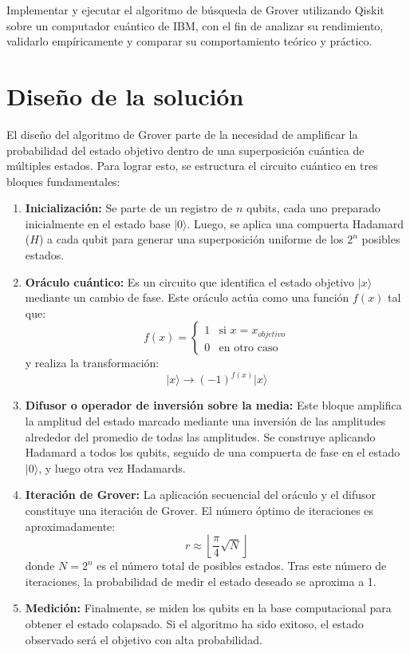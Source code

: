 \documentclass{article}
\begin{document}
Implementar y ejecutar el algoritmo de búsqueda de Grover utilizando Qiskit sobre un computador cuántico de IBM, con el fin de analizar su rendimiento, validarlo empíricamente y comparar su comportamiento teórico y práctico.

\section{Diseño de la solución}\label{sec:dis}

El diseño del algoritmo de Grover parte de la necesidad de amplificar la probabilidad del estado objetivo dentro de una superposición cuántica de múltiples estados. Para lograr esto, se estructura el circuito cuántico en tres bloques fundamentales:

\begin{enumerate}
    \item \textbf{Inicialización:} Se parte de un registro de $n$ qubits, cada uno preparado inicialmente en el estado base $\vert 0 \rangle$. Luego, se aplica una compuerta Hadamard ($H$) a cada qubit para generar una superposición uniforme de los $2^n$ posibles estados.

    \item \textbf{Oráculo cuántico:} Es un circuito que identifica el estado objetivo $\vert x \rangle$ mediante un cambio de fase. Este oráculo actúa como una función $f(x)$ tal que:
    \[
    f(x) = \begin{cases}
    1 & \text{si } x = x_{objetivo} \\
    0 & \text{en otro caso}
    \end{cases}
    \]
    y realiza la transformación:
    \[
    \vert x \rangle \rightarrow (-1)^{f(x)} \vert x \rangle
    \]

    \item \textbf{Difusor o operador de inversión sobre la media:} Este bloque amplifica la amplitud del estado marcado mediante una inversión de las amplitudes alrededor del promedio de todas las amplitudes. Se construye aplicando Hadamard a todos los qubits, seguido de una compuerta de fase en el estado $\vert 0 \rangle$, y luego otra vez Hadamards.

    \item \textbf{Iteración de Grover:} La aplicación secuencial del oráculo y el difusor constituye una iteración de Grover. El número óptimo de iteraciones es aproximadamente:
    \[
    r \approx \left\lfloor \frac{\pi}{4} \sqrt{N} \right\rfloor
    \]
    donde $N = 2^n$ es el número total de posibles estados. Tras este número de iteraciones, la probabilidad de medir el estado deseado se aproxima a 1.

    \item \textbf{Medición:} Finalmente, se miden los qubits en la base computacional para obtener el estado colapsado. Si el algoritmo ha sido exitoso, el estado observado será el objetivo con alta probabilidad.
    
\end{enumerate}
\end{document}
